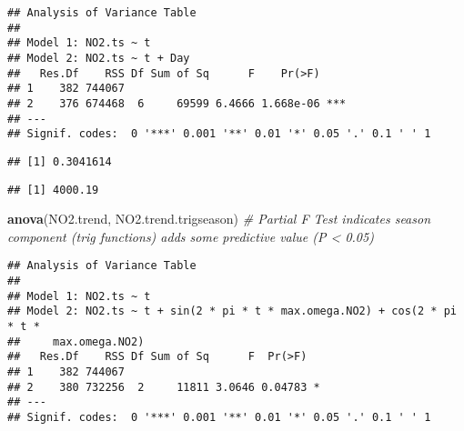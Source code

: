 \documentclass[
]{article}
\newenvironment{Shaded}{\begin{snugshade}}{\end{snugshade}}
\newcommand{\CommentTok}[1]{\textcolor[rgb]{0.56,0.35,0.01}{\textit{#1}}}
\newcommand{\DecValTok}[1]{\textcolor[rgb]{0.00,0.00,0.81}{#1}}
\newcommand{\KeywordTok}[1]{\textcolor[rgb]{0.13,0.29,0.53}{\textbf{#1}}}
\newcommand{\NormalTok}[1]{#1}
\newcommand{\OperatorTok}[1]{\textcolor[rgb]{0.81,0.36,0.00}{\textbf{#1}}}
\newcommand{\StringTok}[1]{\textcolor[rgb]{0.31,0.60,0.02}{#1}}
\begin{document}
\begin{verbatim}
## Analysis of Variance Table
## 
## Model 1: NO2.ts ~ t
## Model 2: NO2.ts ~ t + Day
##   Res.Df    RSS Df Sum of Sq      F    Pr(>F)    
## 1    382 744067                                  
## 2    376 674468  6     69599 6.4666 1.668e-06 ***
## ---
## Signif. codes:  0 '***' 0.001 '**' 0.01 '*' 0.05 '.' 0.1 ' ' 1
\end{verbatim}

\begin{Shaded}
\end{Shaded}

\begin{verbatim}
## [1] 0.3041614
\end{verbatim}

\begin{Shaded}
\end{Shaded}

\begin{verbatim}
## [1] 4000.19
\end{verbatim}

\begin{Shaded}
\begin{Highlighting}[]
\KeywordTok{anova}\NormalTok{(NO2.trend, NO2.trend.trigseason) }\CommentTok{# Partial F Test indicates season component (trig functions) adds some predictive value (P < 0.05)}
\end{Highlighting}
\end{Shaded}

\begin{verbatim}
## Analysis of Variance Table
## 
## Model 1: NO2.ts ~ t
## Model 2: NO2.ts ~ t + sin(2 * pi * t * max.omega.NO2) + cos(2 * pi * t * 
##     max.omega.NO2)
##   Res.Df    RSS Df Sum of Sq      F  Pr(>F)  
## 1    382 744067                              
## 2    380 732256  2     11811 3.0646 0.04783 *
## ---
## Signif. codes:  0 '***' 0.001 '**' 0.01 '*' 0.05 '.' 0.1 ' ' 1
\end{verbatim}
\end{document}

